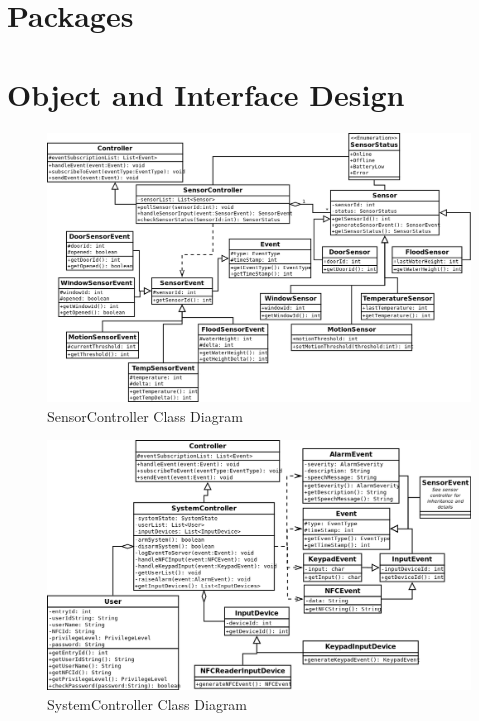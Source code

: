 \documentclass{report}
\begin{document}
\section{Packages}

\section{Object and Interface Design}

\begin{landscape} 
\begin{figure}
    \caption{SensorController Class Diagram}
    \label{fig:sensor_controller_class_diagram}
    \includegraphics[scale=0.5]{sensor_controller_class_diagram.png}
\end{figure}
\end{landscape} 

\begin{landscape} 
\begin{figure}
    \caption{SystemController Class Diagram}
    \label{fig:system_controller_class_diagram}
    \includegraphics[scale=0.5]{system_controller_class_diagram.png}
\end{figure}
\end{landscape} 
\end{document}
